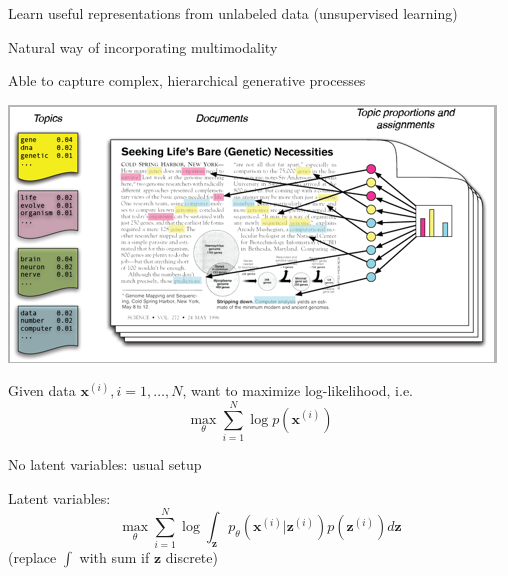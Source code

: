 \documentclass{beamer}
\let\tempone\itemize
\let\temptwo\enditemize
\renewenvironment{itemize}{\tempone\addtolength{\itemsep}{0.5\baselineskip}}{\temptwo}
\newcommand{\zvec}{\mathbf{z}}
\newcommand{\xvec}{\mathbf{x}}
\begin{document}
\begin{frame}
  \begin{center}
   \end{center}
\begin{itemize}
\item Learn useful representations from unlabeled data (unsupervised learning)
\item Natural way of incorporating multimodality
\item Able to capture complex, hierarchical generative processes
\end{itemize}
\end{frame}

\begin{frame}
  \begin{center}
   \end{center}
   \center
\includegraphics[scale=0.5]{lda}
\end{frame}

\begin{frame}
  \begin{center}
   \end{center}
 Given data $\xvec^{(i)}, i = 1, \dots, N$, want to maximize log-likelihood, i.e.
 \[ \max_\theta \sum_{i=1}^N \log p(\xvec^{(i)})\]
\begin{itemize}
\item No latent variables: usual setup
\item Latent variables:
\[ \max_\theta \sum_{i=1}^N \log \int_\zvec p_\theta(\xvec^{(i)} | \zvec^{(i)})p(\zvec^{(i)}) d\zvec \]
(replace $\int$ with sum if $\zvec$ discrete)
\end{itemize}
\end{frame}
\end{document}
